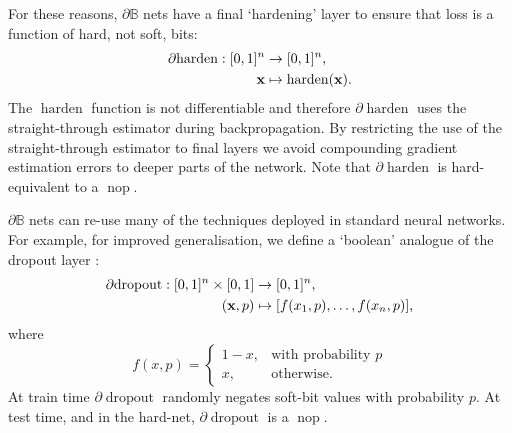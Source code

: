 \documentclass{article} %
\begin{document}
For these reasons, $\partial\mathbb{B}$ nets have a final `hardening' layer to ensure that loss is a function of hard, not soft, bits:
\begin{equation*}
\begin{aligned}
\partial\!\operatorname{harden}: [0,1]^{n} &\to [0,1]^{n}, \\
{\bf x} &\mapsto \operatorname{harden}({\bf x})\text{.}
\end{aligned}
\end{equation*}
The $\operatorname{harden}$ function is not differentiable and therefore $\partial\!\operatorname{harden}$ uses the straight-through estimator \citep{DBLP:journals/corr/BengioLC13} during backpropagation. By restricting the use of the straight-through estimator to final layers we avoid compounding gradient estimation errors to deeper parts of the network. Note that $\partial\!\operatorname{harden}$ is hard-equivalent to a $\operatorname{nop}$.

$\partial\mathbb{B}$ nets can re-use many of the techniques deployed in standard neural networks. For example, for improved generalisation, we define a `boolean' analogue of the dropout layer \citep{JMLR:v15:srivastava14a}:
\begin{equation*}
\begin{aligned}
\partial\!\operatorname{dropout}: [0,1]^{n} \times [0,1] &\to [0,1]^{n}, \\
({\bf x}, p) &\mapsto [f(x_{1}, p), \dots, f(x_{n}, p)]\text{,}
\end{aligned}
\end{equation*}
where
\begin{equation*}
f(x, p) = \begin{cases}
1 - x, & \text{with probability } p \\
x, & \text{otherwise.}
\end{cases}
\end{equation*}
At train time $\partial\!\operatorname{dropout}$ randomly negates soft-bit values with probability $p$. At test time, and in the hard-net, $\partial\!\operatorname{dropout}$ is a $\operatorname{nop}$.
\end{document}
